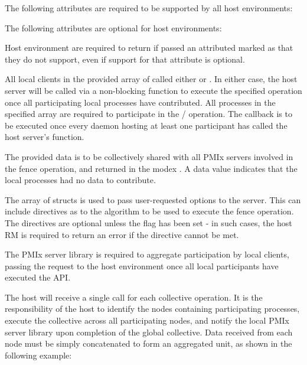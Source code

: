 The following attributes are required to be supported by all host environments:


\reqattrend

\optattrstart
The following attributes are optional for host environments:


\optattrend

\advicermstart
Host environment are required to return  if passed an attributed marked as  that they do not support, even if support for that attribute is optional.
\advicermend

\descr

All local clients in the provided array of  called either  or .
In either case, the host server will be called via a non-blocking function to execute the specified operation once all participating local processes have contributed.
All processes in the specified  array are required to participate in the / operation.
The callback is to be executed once every daemon hosting at least one participant has called the host server's  function.

The provided data is to be collectively shared with all \ac{PMIx} servers involved in the fence operation, and returned in the modex .
A  data value indicates that the local processes had no data to contribute.

The array of  structs is used to pass user-requested options to the server.
This can include directives as to the algorithm to be used to execute the fence operation.
The directives are optional unless the  flag has been set - in such cases, the host \ac{RM} is required to return an error if the directive cannot be met.

\adviceimplstart
The \ac{PMIx} server library is required to aggregate participation by local clients, passing the request to the host environment once all local participants have executed the \ac{API}.
\adviceimplend

\advicermstart
The host will receive a single call for each collective operation. It is the responsibility of the host to identify the nodes containing participating processes, execute the collective across all participating nodes, and notify the local \ac{PMIx} server library upon completion of the global collective. Data received from each node must be simply concatenated to form an aggregated unit, as shown in the following example:


